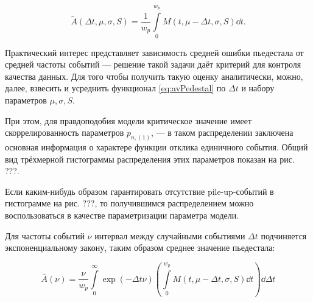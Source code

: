 \begin{equation}
    \tilde{A}(\Delta t, \mu, \sigma, S) = \frac{1}{w_p} \int\limits_{0}^{w_p} M(t, \mu - \Delta t, \sigma, S) \dd t.
    \label{eq:avPedestal}
\end{equation}

Практический интерес представляет зависимость средней ошибки пьедестала от
средней частоты событий --- решение такой задачи даёт критерий для контроля
качества данных. Для того чтобы получить такую оценку аналитически, можно,
далее, взвесить и усреднить
функционал \eqref{eq:avPedestal} по $\Delta t$ и набору параметров
$\mu, \sigma, S$.


При этом, для правдоподобия модели критическое значение имеет
скоррелированность параметров $p_{n,(1)}$, --- в таком распределении
заключена основная информация о характере функции отклика единичного события.
Общий вид трёхмерной гистограммы распределения этих параметров показан на
рис. ???.

Если каким-нибудь образом гарантировать отсутствие pile-up-событий в
гистограмме на рис. ???, то получившимся распределением можно воспользоваться
в качестве параметризации параметра модели.

Для частоты событий $\nu$ интервал между случайными событиями $\Delta t$
подчиняется экспоненциальному закону, таким образом среднее значение
пьедестала:

\begin{equation}
    \bar{A} (\nu) = \frac{\nu}{w_p} \int\limits_0^{\infty} \exp(- \Delta t \nu ) \left(
        \int\limits_{0}^{w_p} M(t, \mu - \Delta t, \sigma, S) \dd t \right) \dd \Delta t
\end{equation}
\fi
